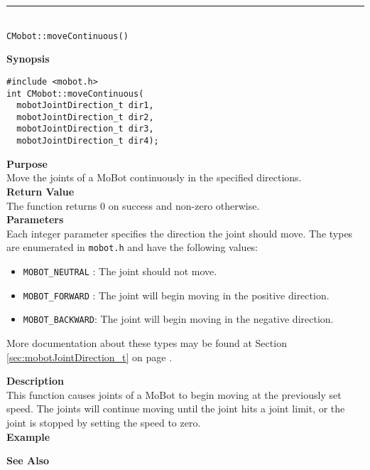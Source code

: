 \noindent
\vspace{5pt}
\rule{4.5in}{0.015in}\\
\noindent
{\LARGE \texttt{CMobot::moveContinuous()}}\\
{}

\noindent
{\bf Synopsis}\\
\begin{verbatim}
#include <mobot.h>
int CMobot::moveContinuous(
  mobotJointDirection_t dir1, 
  mobotJointDirection_t dir2, 
  mobotJointDirection_t dir3, 
  mobotJointDirection_t dir4);
\end{verbatim}

\noindent
{\bf Purpose}\\
Move the joints of a MoBot continuously in the specified directions.\\

\noindent
{\bf Return Value}\\
The function returns 0 on success and non-zero otherwise.\\

\noindent
{\bf Parameters}\\
Each integer parameter specifies the direction the joint should move. The types
are enumerated in \texttt{mobot.h} and have the following values:
\begin{itemize}
\item \texttt{MOBOT\_NEUTRAL} : The joint should not move.
\item \texttt{MOBOT\_FORWARD} : The joint will begin moving in the positive direction.
\item \texttt{MOBOT\_BACKWARD}: The joint will begin moving in the negative direction.
\end{itemize}
More documentation about these types may be found at Section
\ref{sec:mobotJointDirection_t} on page
\pageref{sec:mobotJointDirection_t}.

\noindent
{\bf Description}\\
This function causes joints of a MoBot to begin moving at the previously set
speed. The joints will continue moving until the joint hits a joint limit, or
the joint is stopped by setting the speed to zero.\\

\noindent
{\bf Example}\\
\noindent

\noindent
{\bf See Also}\\

